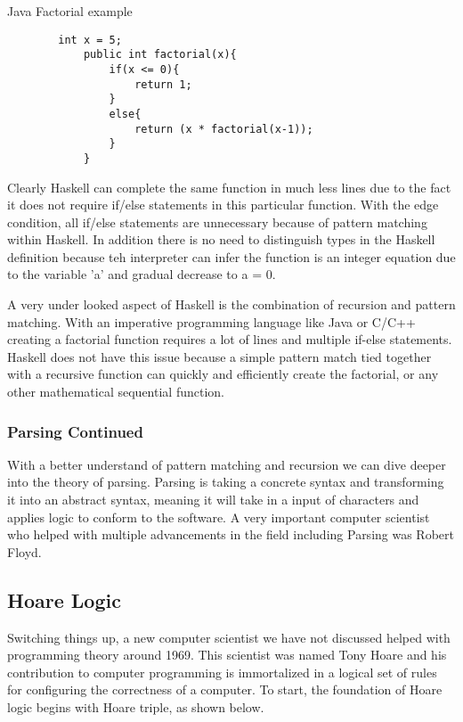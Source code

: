 \documentclass{article}
\begin{document}
        \medskip
        \caption{Java Factorial example}
        \begin{lstlisting}
        int x = 5;
            public int factorial(x){
                if(x <= 0){
                    return 1;
                }
                else{
                    return (x * factorial(x-1));
                }
            }
        \end{lstlisting}
        Clearly Haskell can complete the same function in much less lines due to the fact it does not require if/else statements in this particular function. With the edge condition, all if/else statements are unnecessary because of pattern matching within Haskell. In addition there is no need to distinguish types in the Haskell definition because teh interpreter can infer the function is an integer equation due to the variable 'a' and gradual decrease to a = 0.
        
        \medskip
        \noindent A very under looked aspect of Haskell is the combination of recursion and pattern matching. With an imperative programming language like Java or C/C++ creating a factorial function requires a lot of lines and multiple if-else statements. Haskell does not have this issue because a simple pattern match tied together with a recursive function can quickly and efficiently create the factorial, or any other mathematical sequential function.
        
        
        
        \subsubsection{Parsing Continued}
        With a better understand of pattern matching and recursion we can dive deeper into the theory of parsing. Parsing is taking a concrete syntax and transforming it into an abstract syntax, meaning it will take in a input of characters and applies logic to conform to the software. A very important computer scientist who helped with multiple advancements in the field including Parsing was Robert Floyd.
    
\subsection{Hoare Logic}
Switching things up, a new computer scientist we have not discussed helped with programming theory around 1969. This scientist was named Tony Hoare and his contribution to computer programming is immortalized in a logical set of rules for configuring the correctness of a computer. To start, the foundation of Hoare logic begins with Hoare triple, as shown below.
\end{document}
